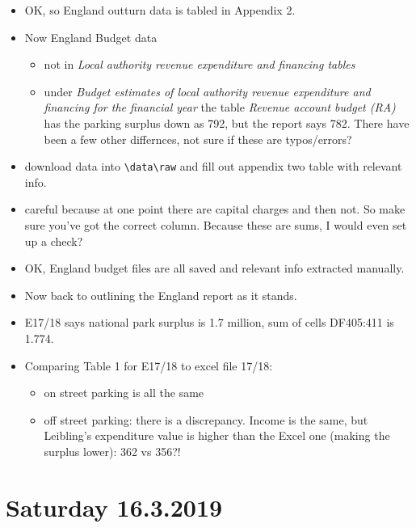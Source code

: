 \documentclass[]{article}
\providecommand{\tightlist}{%
  \setlength{\itemsep}{0pt}\setlength{\parskip}{0pt}}
\begin{document}
\begin{itemize}
\tightlist
\item
  OK, so England outturn data is tabled in Appendix 2.
\item
  Now England Budget data

  \begin{itemize}
  \tightlist
  \item
    not in \emph{Local authority revenue expenditure and financing
    tables}
  \item
    under \emph{Budget estimates of local authority revenue expenditure
    and financing for the financial year} the table \emph{Revenue
    account budget (RA)} has the parking surplus down as 792, but the
    report says 782. There have been a few other differnces, not sure if
    these are typos/errors?
  \end{itemize}
\item
  download data into \texttt{\textbackslash{}data\textbackslash{}raw}
  and fill out appendix two table with relevant info.
\item
  careful because at one point there are capital charges and then not.
  So make sure you've got the correct column. Because these are sums, I
  would even set up a check?
\item
  OK, England budget files are all saved and relevant info extracted
  manually.
\item
  Now back to outlining the England report as it stands.
\item
  E17/18 says national park surplus is 1.7 million, sum of cells
  DF405:411 is 1.774.
\item
  Comparing Table 1 for E17/18 to excel file 17/18:

  \begin{itemize}
  \tightlist
  \item
    on street parking is all the same
  \item
    off street parking: there is a discrepancy. Income is the same, but
    Leibling's expenditure value is higher than the Excel one (making
    the surplus lower): 362 vs 356?!
  \end{itemize}
\end{itemize}

\hypertarget{saturday-16.3.2019}{%
\section{Saturday 16.3.2019}\label{saturday-16.3.2019}}
\end{document}

